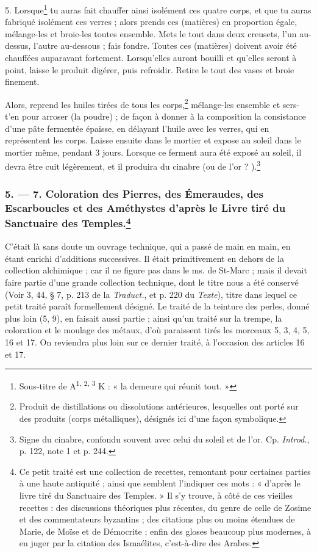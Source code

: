 \documentclass[a4paper, 11pt, oneside, polutonikogreek, french]{article}
\begin{document}
5. Lorsque\footnote{Sous-titre de A\textsuperscript{1, 2, 3}  K : « la demeure qui réunit tout. »} tu auras fait chauffer ainsi isolément ces quatre corps, et que tu auras fabriqué isolément ces verres ; alors prends ces (matières) en proportion égale, mélange-les et broie-les toutes ensemble. Mets le tout dans deux creusets, l'un au-dessus, l'autre au-dessous ; fais fondre. Toutes ces (matières) doivent avoir été chauffées auparavant fortement. Lorsqu'elles auront bouilli et qu'elles seront à point, laisse le produit digérer, puis refroidir. Retire le tout des vases et broie finement.

Alors, reprend les huiles tirées de tous les corps,\footnote{Produit de distillations ou dissolutions antérieures, lesquelles ont porté sur des produits (corps métalliques), désignés ici d'une façon symbolique.} mélange-les ensemble et sers-t'en pour arroser (la poudre) ; de façon à donner à la composition la consistance d'une pâte fermentée épaisse, en délayant l'huile avec les verres, qui en représentent les corps. Laisse ensuite dans le mortier et expose au soleil dans le mortier même, pendant 3 jours. Lorsque ce ferment aura été exposé au soleil, il devra être cuit légèrement, et il produira du cinabre (ou de l'or ? ).\footnote{Signe du cinabre, confondu souvent avec celui du soleil et de l'or. Cp. \emph{Introd.}, p. 122, note 1 et p. 244.}

\bigskip
\centerline{\EightStarTaper}
\centerline{\EightStarTaper\EightStarTaper}
\bigskip

\subsubsection[5. --- 7. Coloration des Pierres, des Émeraudes, des Escarboucles et des Améthystes d'après le Livre tiré du Sanctuaire des Temples.]{5. --- 7. Coloration des Pierres, des Émeraudes, des Escarboucles et des Améthystes d'après le Livre tiré du Sanctuaire des Temples.\footnote{Ce petit traité est une collection de recettes, remontant pour certaines parties à une haute antiquité ; ainsi que semblent l'indiquer ces mots : « d'après le livre tiré du Sanctuaire des Temples. » Il s'y trouve, à côté de ces vieilles recettes : des discussions théoriques plus récentes, du genre de celle de Zosime et des commentateurs byzantins ; des citations plus ou moins étendues de Marie, de Moïse et de Démocrite ; enfin des gloses beaucoup plus modernes, à en juger par la citation des Ismaélites, c'est-à-dire des Arabes.  }}

C'était là sans doute un ouvrage technique, qui a passé de main en main, en étant enrichi d'additions successives. Il était primitivement en dehors de la collection alchimique ; car il ne figure pas dans le ms. de St-Marc ; mais il devait faire partie d'une grande collection technique, dont le titre nous a été conservé (Voir 3, 44, § 7, p. 213 de la \emph{Traduct.}, et p. 220 du \emph{Texte}), titre dans lequel ce petit traité paraît formellement désigné. Le traité de la teinture des perles, donné plus loin (5, 9), en faisait aussi partie ; ainsi qu'un traité sur la trempe, la coloration et le moulage des métaux, d'où paraissent tirés les morceaux 5, 3, 4, 5, 16 et 17. On reviendra plus loin sur ce dernier traité, à l'occasion des articles 16 et 17.
\end{document}
